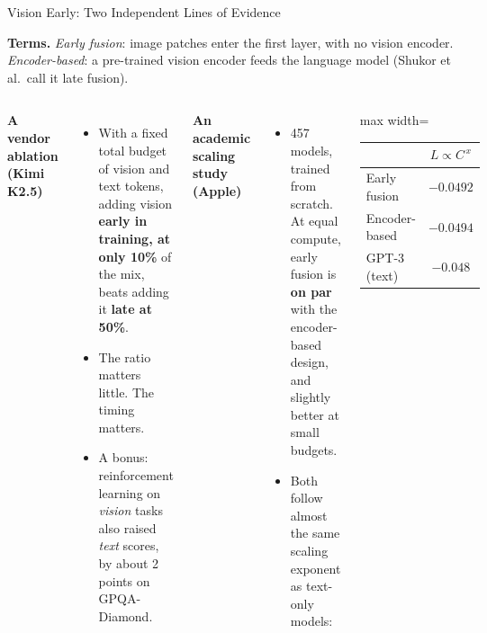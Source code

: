 \begin{frame}{Vision Early: Two Independent Lines of Evidence}

    {\footnotesize \textbf{Terms.} \emph{Early fusion}: image patches enter the first layer, with no vision encoder. \emph{Encoder-based}: a pre-trained vision encoder feeds the language model (Shukor et al.\ call it late fusion).\par}
    \vspace{0.2em}
    \begin{columns}[T,onlytextwidth]
        \textbf{A vendor ablation (Kimi K2.5)}
        \begin{itemize}\small\itemsep0.2em
            \item With a fixed total budget of vision and text tokens, adding vision \textbf{early in training, at only 10\%} of the mix, beats adding it \textbf{late at 50\%}.
            \item The ratio matters little. The timing matters.
            \item A bonus: reinforcement learning on \emph{vision} tasks also raised \emph{text} scores, by about 2 points on GPQA-Diamond.
        \end{itemize}
        \textbf{An academic scaling study (Apple)}
        \begin{itemize}\small\itemsep0.2em
            \item 457 models, trained from scratch. At equal compute, early fusion is \textbf{on par} with the encoder-based design, and slightly better at small budgets.
            \item Both follow almost the same scaling exponent as text-only models:
        \end{itemize}
        \vspace{0.2em}
        \centering
        \footnotesize
        \begin{adjustbox}{max width=\linewidth}\begin{tabular}{lc}
            \toprule
            & $L\propto C^{\,x}$ \\
            \midrule
            Early fusion & $-0.0492$ \\
            Encoder-based & $-0.0494$ \\
            GPT-3 (text) & $-0.048$ \\
            \bottomrule
        \end{tabular}\end{adjustbox}
    \end{columns}
    \vspace{0.3em}
\end{frame}

